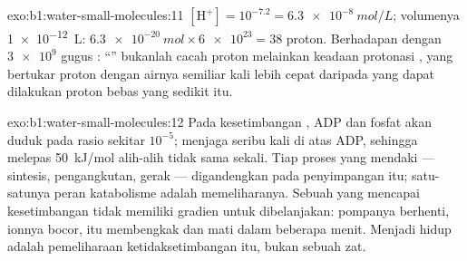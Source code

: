 \begin{solution}{exo:b1:water-small-molecules:11}
$[\mathrm{H^+}] = 10^{-7.2} = \qty{6.3e-8}{mol/L}$; volumenya
\qty{1e-12}{L}: $\qty{6.3e-20}{mol}\times\num{6e23} = 38$ proton.
Berhadapan dengan $\num{3e9}$ gugus : ``'' bukanlah cacah
proton melainkan keadaan protonasi , yang bertukar proton
dengan airnya semiliar kali lebih cepat daripada yang dapat dilakukan
proton bebas yang sedikit itu.
\end{solution}

\begin{solution}{exo:b1:water-small-molecules:12}
Pada kesetimbangan , ADP dan fosfat akan duduk pada rasio sekitar
$10^{-5}$;  menjaga  seribu kali di atas ADP, sehingga
 melepas \qty{50}{kJ/mol} alih-alih tidak sama sekali.
Tiap proses yang mendaki --- sintesis, pengangkutan, gerak ---
digandengkan pada penyimpangan itu; satu-satunya peran katabolisme
adalah memeliharanya. Sebuah  yang  mencapai kesetimbangan
tidak memiliki gradien untuk dibelanjakan: pompanya berhenti, ionnya
bocor,  itu membengkak dan mati dalam beberapa menit. Menjadi hidup
adalah pemeliharaan ketidaksetimbangan itu, bukan sebuah zat.
\end{solution}

